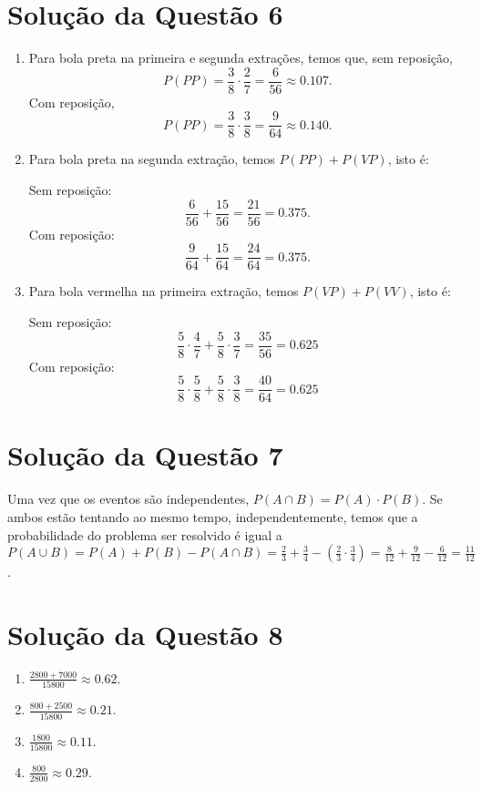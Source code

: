 \documentclass[
	12pt,				%
	openright,			%
	twoside,			%
	a4paper,			%
	english,			%
	french,				%
	spanish,			%
	brazil,				%
	]{abntex2}
\begin{document}
\section{Solução da Questão 6}

\begin{enumerate}[label=\alph*)]
    \item Para bola preta na primeira e segunda extrações, temos que, sem reposição,
    $$P(PP) = \frac{3}{8}\cdot\frac{2}{7} = \frac{6}{56} \approx 0.107.$$
    Com reposição, 
    $$P(PP) = \frac{3}{8}\cdot\frac{3}{8} = \frac{9}{64} \approx 0.140.$$
    
    \item Para bola preta na segunda extração, temos $P(PP) + P(VP)$, isto é:
    
    Sem reposição:
    $$\frac{6}{56} + \frac{15}{56} = \frac{21}{56} = 0.375.$$
    Com reposição:
    $$\frac{9}{64} + \frac{15}{64} = \frac{24}{64} = 0.375.$$
    
    \item Para bola vermelha na primeira extração, temos $P(VP) + P(VV)$, isto é:
    
    Sem reposição:
    $$\frac{5}{8}\cdot \frac{4}{7} + \frac{5}{8}\cdot \frac{3}{7} = \frac{35}{56} = 0.625$$
    Com reposição:
    $$\frac{5}{8}\cdot \frac{5}{8} + \frac{5}{8}\cdot \frac{3}{8} = \frac{40}{64} = 0.625$$
    
\end{enumerate}


\section{Solução da Questão 7}
Uma vez que os eventos são independentes, $P(A \cap B) = P(A)\cdot P(B)$. Se ambos estão tentando ao mesmo tempo, independentemente, temos que a probabilidade do problema ser resolvido é igual a $P(A \cup B) = P(A) + P(B) - P(A \cap B) = \frac{2}{3} + \frac{3}{4} - (\frac{2}{3} \cdot \frac{3}{4}) = \frac{8}{12} + \frac{9}{12} - \frac{6}{12} = \frac{11}{12}$.

\section{Solução da Questão 8}
\begin{enumerate}[label=\alph*)]
    \item $\frac{2800 + 7000}{15800} \approx 0.62.$
    \item $\frac{800 + 2500}{15800} \approx 0.21.$
    \item $\frac{1800}{15800} \approx 0.11.$
    \item $\frac{800}{2800} \approx 0.29.$
\end{enumerate}
\end{document}

